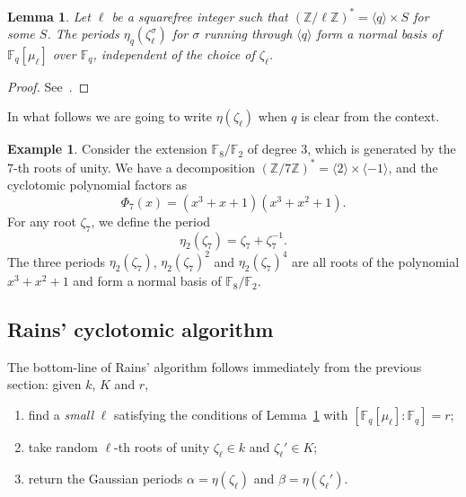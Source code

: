 \documentclass[12pt]{article}
\theoremstyle{plain}
\newtheorem{lemma}[theorem]{Lemma}
\theoremstyle{definition}
\newtheorem{example}[theorem]{Example}
\def\Z{\ensuremath{\mathbb{Z}}}
\def\F{\ensuremath{\mathbb{F}}}
\newcounter{algorithm}
\begin{document}
\begin{lemma}
  \label{th:gaussian}
  Let $\ell$ be a squarefree integer such that $(\Z/\ell\Z)^\ast =
  \langle q\rangle \times S$ for some $S$.  The periods
  $\eta_q(\zeta_\ell^\sigma)$ for $\sigma$ running through $\langle
  q\rangle$ form a normal basis of $\F_q[\mu_\ell]$ over $\F_q$,
  independent of the choice of $\zeta_\ell$.
\end{lemma}
\begin{proof}
  See~\cite[Main Theorem]{feisel1999normal}.
\end{proof}

In what follows we are going to write $\eta(\zeta_\ell)$ when $q$ is
clear from the context.

\begin{example} 
  Consider the extension $\F_8/\F_2$ of degree $3$, which is generated
  by the $7$-th roots of unity. We have a decomposition
  $(\Z/7\Z)^\ast=\langle 2\rangle\times\langle-1\rangle$, and the
  cyclotomic polynomial factors as
  \begin{equation}
    \Phi_7(x) = (x^3 + x + 1) (x^3 + x^2 + 1).
  \end{equation}
  For any root $\zeta_7$, we define the period
  \begin{equation}
    \eta_2(\zeta_7) = \zeta_7+\zeta_7^{-1}.
  \end{equation}
  The three periods $\eta_2(\zeta_7)$, $\eta_2(\zeta_7)^2$ and
  $\eta_2(\zeta_7)^4$ are all roots of the polynomial $x^3+x^2+1$ and
  form a normal basis of $\F_8/\F_2$.
\end{example}

\subsection{Rains' cyclotomic algorithm}

The bottom-line of Rains' algorithm follows immediately from the
previous section: given $k$, $K$ and $r$,
\begin{enumerate}
\item find a \emph{small} $\ell$ satisfying the conditions of
  Lemma~\ref{th:gaussian} with $[\F_q[\mu_\ell]:\F_q]=r$;
\item take random $\ell$-th roots of unity $\zeta_\ell\in k$ and
  $\zeta_\ell'\in K$;
\item return the Gaussian periods $\alpha=\eta(\zeta_\ell)$ and
  $\beta=\eta(\zeta_\ell')$.
\end{enumerate}
\end{document}
